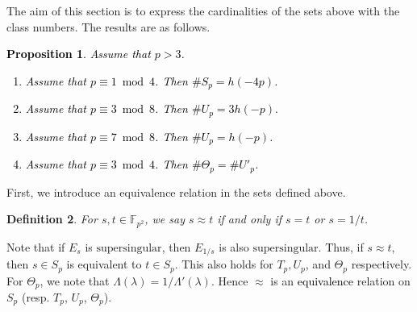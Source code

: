 \documentclass[10pt,a4paper]{amsart}
\newtheorem{defn}{Definition}[section]
\theoremstyle{plain}
\newtheorem{prop}[defn]{Proposition}
\newcommand{\lm}{\lambda}
\newcommand{\Lm}{\Lambda}
\newcommand{\fpp}{\mathbb{F}_{p^2}}
\newcommand{\super}{\text{supersingular}}
\begin{document}
The aim of this section is to express the cardinalities of the sets above with the class numbers. The results are as follows. 
\textcolor{black}{
\begin{prop}
    \label{classnumber}
    Assume that $p>3$.
    \begin{enumerate}
        \item [\rm{(a)}] Assume that $ p \equiv 1 \bmod 4$. Then   $\#S_p=h(-4p)$. 
        \item [\rm{(b)}] Assume that $p \equiv 3  \bmod 8 $. Then $\#U_p=3h(-p).$ 
        \item[\rm{(c)}] Assume that $ p \equiv 7 \bmod 8$. Then $\#U_p=h(-p)$.
        \item[\rm{(d)}] Assume that $p \equiv 3 \bmod 4$. Then $\#{\Theta}_p=\# U'_p$.
    \end{enumerate}
\end{prop}
}

   

   

 

First, we introduce an equivalence relation in the sets defined above.
\begin{defn}
\label{eqrelation}
For $s,t \in \fpp$, we say $s \approx t$ if and only if $s=t$ or $s=1/t$.
\end{defn}
 Note that if $E_s$ is $\super$, then $E_{1/s}$ is also $\super$. Thus, if $s \approx t $, then $s \in S_p$ is equivalent to $t \in S_p$. This also holds for $T_p, U_p$, and ${\Theta}_p$ respectively. For ${\Theta}_p$, we note that $\Lm(\lm)=1/{\Lm}'(\lm)$. Hence $\approx$ is an \textcolor{black}{equivalence} relation on $S_p$ (resp. $T_p$,  $U_p$, ${\Theta}_p$).
    
\end{document}
